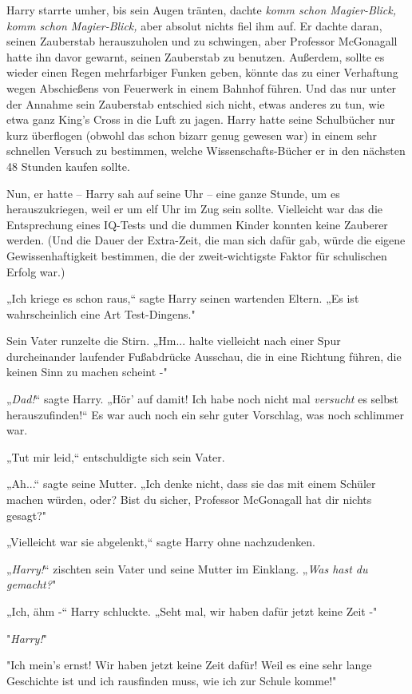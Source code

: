 {Harry starrte umher, bis sein Augen tränten, dachte \emph{komm schon Magier-Blick, komm schon Magier-Blick,} aber absolut nichts fiel ihm auf. Er dachte daran, seinen Zauberstab herauszuholen und zu schwingen, aber Professor McGonagall hatte ihn davor gewarnt, seinen Zauberstab zu benutzen. Außerdem, sollte es wieder einen Regen mehrfarbiger Funken geben, könnte das zu einer Verhaftung wegen Abschießens von Feuerwerk in einem Bahnhof führen. Und das nur unter der Annahme sein Zauberstab entschied sich nicht, etwas anderes zu tun, wie etwa ganz King's Cross in die Luft zu jagen. Harry hatte seine Schulbücher nur kurz überflogen (obwohl das schon bizarr genug gewesen war) in einem sehr schnellen Versuch zu bestimmen, welche Wissenschafts-Bücher er in den nächsten 48 Stunden kaufen sollte.

Nun, er hatte -- Harry sah auf seine Uhr -- eine ganze Stunde, um es herauszukriegen, weil er um elf Uhr im Zug sein sollte. Vielleicht war das die Entsprechung eines IQ-Tests und die dummen Kinder konnten keine Zauberer werden. (Und die Dauer der Extra-Zeit, die man sich dafür gab, würde die eigene Gewissenhaftigkeit bestimmen, die der zweit-wichtigste Faktor für schulischen Erfolg war.)

„Ich kriege es schon raus,“ sagte Harry seinen wartenden Eltern. „Es ist wahrscheinlich eine Art Test-Dingens."

Sein Vater runzelte die Stirn. „Hm... halte vielleicht nach einer Spur durcheinander laufender Fußabdrücke Ausschau, die in eine Richtung führen, die keinen Sinn zu machen scheint -"

„\emph{Dad!}“ sagte Harry. „Hör' auf damit! Ich habe noch nicht mal \emph{versucht} es selbst herauszufinden!“ Es war auch noch ein sehr guter Vorschlag, was noch schlimmer war.

„Tut mir leid,“ entschuldigte sich sein Vater.

„Ah...“ sagte seine Mutter. „Ich denke nicht, dass sie das mit einem Schüler machen würden, oder? Bist du sicher, Professor McGonagall hat dir nichts gesagt?"

„Vielleicht war sie abgelenkt,“ sagte Harry ohne nachzudenken.

„\emph{Harry!}“ zischten sein Vater und seine Mutter im Einklang. „\emph{Was hast du gemacht?}"

„Ich, ähm -“ Harry schluckte. „Seht mal, wir haben dafür jetzt keine Zeit -"

"\emph{Harry!}"

"Ich mein's ernst! Wir haben jetzt keine Zeit dafür! Weil es eine sehr lange Geschichte ist und ich rausfinden muss, wie ich zur Schule komme!"

}
